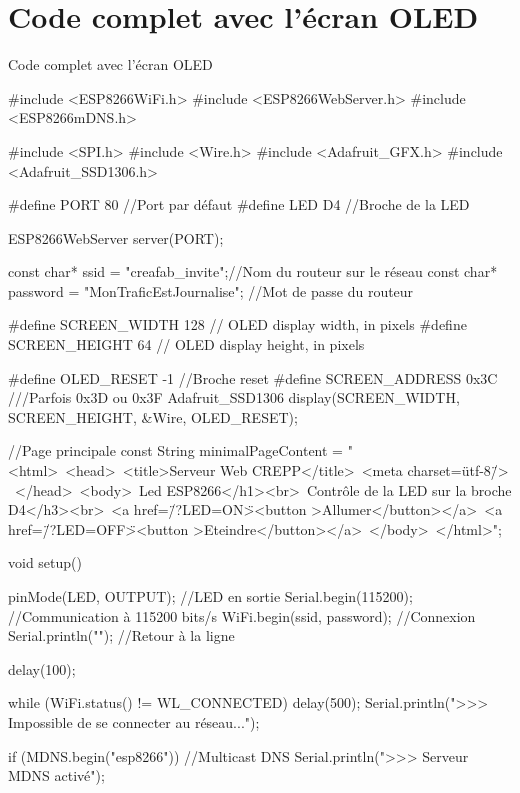 \section{Code complet avec l'écran OLED}
\begin{Cpp}{Code complet avec l'écran OLED}

    #include <ESP8266WiFi.h>
    #include <ESP8266WebServer.h>
    #include <ESP8266mDNS.h>
    
    
    #include <SPI.h>
    #include <Wire.h>
    #include <Adafruit_GFX.h>
    #include <Adafruit_SSD1306.h>
    
    
    #define PORT 80 //Port par défaut
    #define LED D4  //Broche de la LED
    
    ESP8266WebServer server(PORT);
    
    const char* ssid     = "creafab_invite";//Nom du routeur sur le réseau 
    const char* password = "MonTraficEstJournalise"; //Mot de passe du routeur
    
    
    #define SCREEN_WIDTH 128 // OLED display width, in pixels
    #define SCREEN_HEIGHT 64 // OLED display height, in pixels
    
    #define OLED_RESET     -1 //Broche reset
    #define SCREEN_ADDRESS 0x3C ///Parfois 0x3D ou 0x3F
    Adafruit_SSD1306 display(SCREEN_WIDTH, SCREEN_HEIGHT, &Wire, OLED_RESET);
    
    //Page principale
    const String minimalPageContent = "<html>\
      <head>\
        <title>Serveur Web CREPP</title>\
        <meta charset=\"utf-8\"/> \
        </head>\
      <body>\
        <h1>Led ESP8266</h1><br>\
        <h3>Contrôle de la LED sur la broche D4</h3><br>\
          <a href=\"/?LED=ON\"><button >Allumer</button></a>\
          <a href=\"/?LED=OFF\"><button >Eteindre</button></a>\
      </body>\
    </html>";
    
    void setup() {
      
      pinMode(LED, OUTPUT);       //LED en sortie
      Serial.begin(115200);       //Communication à 115200 bits/s
      WiFi.begin(ssid, password); //Connexion
      Serial.println("");         //Retour à la ligne
    
      delay(100);
      
      while (WiFi.status() != WL_CONNECTED) 
      {
        delay(500);
        Serial.println(">>> Impossible de se connecter au réseau...");
      }
      
    
      if (MDNS.begin("esp8266")) {   //Multicast DNS 
        Serial.println(">>> Serveur MDNS activé");
      }
    
}
\end{Cpp}
